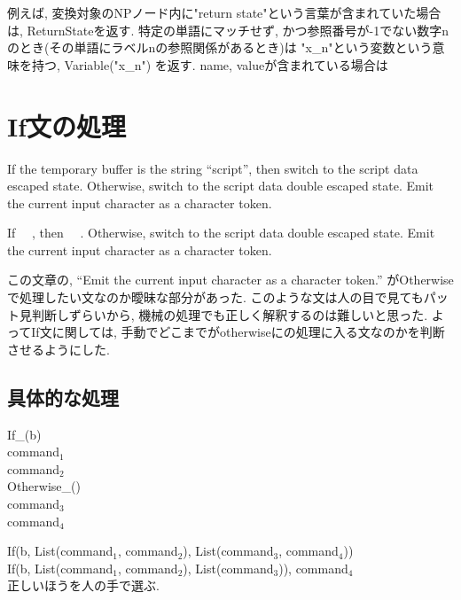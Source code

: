 \documentclass[uplatex,a4j]{jsreport}
\begin{document}
例えば, 変換対象のNPノード内に"return state"という言葉が含まれていた場合は, ReturnStateを返す. 
特定の単語にマッチせず, かつ参照番号が-1でない数字nのとき(その単語にラベルnの参照関係があるとき)は "x\_n"という変数という意味を持つ, Variable("x\_n") を返す.
      name, valueが含まれている場合は

\section{If文の処理}
If the temporary buffer is the string ``script'', then switch to the script data escaped state. Otherwise, switch to the script data double escaped state. Emit the current input character as a character token.

If ~~, then ~~. Otherwise, switch to the script data double escaped state. Emit the current input character as a character token.

この文章の, ``Emit the current input character as a character token.'' がOtherwiseで処理したい文なのか曖昧な部分があった. 
このような文は人の目で見てもパット見判断しずらいから, 機械の処理でも正しく解釈するのは難しいと思った.
よってIf文に関しては, 手動でどこまでがotherwiseにの処理に入る文なのかを判断させるようにした. 

\subsection{具体的な処理}
\begin{screen}
      If_(b)\\
      command$_1$\\
      command$_2$\\
      Otherwise_()\\
      command$_3$\\
      command$_4$
\end{screen}

If(b, List(command$_1$, command$_2$), List(command$_3$, command$_4$))\\
If(b, List(command$_1$, command$_2$), List(command$_3$)), command$_4$\\
正しいほうを人の手で選ぶ.


\end{document}
